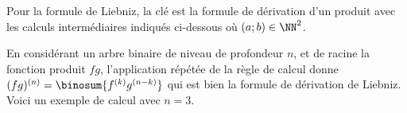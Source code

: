 Pour la formule de Liebniz, la clé est la formule de dérivation d'un produit avec les calculs intermédiaires indiqués ci-dessous où $(a;b) \in \NN^2$.

%
            {\intertree}{\prodder}


En considérant un arbre binaire de niveau de profondeur $n$, et de racine la fonction produit $f g$, l'application répétée de la règle de calcul donne 
$(fg)^{(n)} = \binosum{f^{(k)} g^{(n-k)}}$
qui est bien la formule de dérivation de Liebniz.
%
Voici un exemple de calcul avec $n=3$.

\binotree{\prodder}


